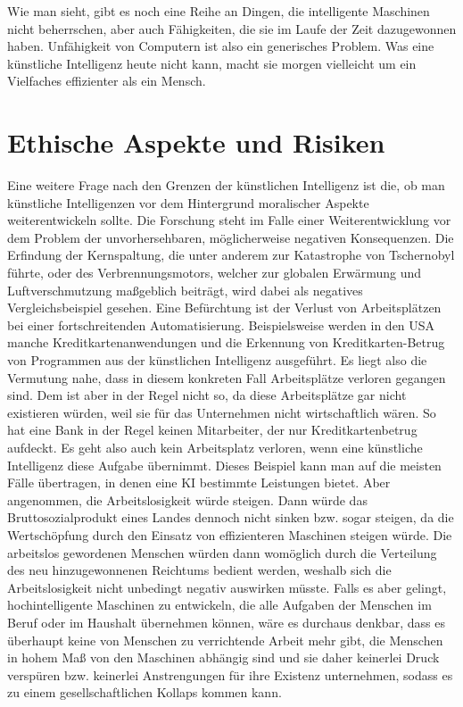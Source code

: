 Wie man sieht, gibt es noch eine Reihe an Dingen, die intelligente Maschinen nicht beherrschen, aber auch Fähigkeiten, die sie im Laufe der Zeit dazugewonnen haben.
Unfähigkeit von Computern ist also ein generisches Problem.
Was eine künstliche Intelligenz heute nicht kann, macht sie morgen vielleicht um ein Vielfaches effizienter als ein Mensch.

\section{Ethische Aspekte und Risiken}
Eine weitere Frage nach den Grenzen der künstlichen Intelligenz ist die, ob man künstliche Intelligenzen vor dem Hintergrund moralischer Aspekte weiterentwickeln sollte.
Die Forschung steht im Falle einer Weiterentwicklung vor dem Problem der unvorhersehbaren, möglicherweise negativen Konsequenzen.
Die Erfindung der Kernspaltung, die unter anderem zur Katastrophe von Tschernobyl führte, oder des Verbrennungsmotors, welcher zur globalen Erwärmung und Luftverschmutzung maßgeblich beiträgt, wird dabei als negatives Vergleichsbeispiel gesehen.
Eine Befürchtung ist der Verlust von Arbeitsplätzen bei einer fortschreitenden Automatisierung.
Beispielsweise werden in den USA manche Kreditkartenanwendungen und die Erkennung von Kreditkarten-Betrug von Programmen aus der künstlichen Intelligenz ausgeführt.
Es liegt also die Vermutung nahe, dass in diesem konkreten Fall Arbeitsplätze verloren gegangen sind.
Dem ist aber in der Regel nicht so, da diese Arbeitsplätze gar nicht existieren würden, weil sie für das Unternehmen nicht wirtschaftlich wären.
So hat eine Bank in der Regel keinen Mitarbeiter, der nur Kreditkartenbetrug aufdeckt.
Es geht also auch kein Arbeitsplatz verloren, wenn eine künstliche Intelligenz diese Aufgabe übernimmt.
Dieses Beispiel kann man auf die meisten Fälle übertragen, in denen eine KI bestimmte Leistungen bietet.
Aber angenommen, die Arbeitslosigkeit würde steigen.
Dann würde das Bruttosozialprodukt eines Landes dennoch nicht sinken bzw.
sogar steigen, da die Wertschöpfung durch den Einsatz von effizienteren Maschinen steigen
würde.
Die arbeitslos gewordenen Menschen würden dann womöglich durch die Verteilung
des neu hinzugewonnenen Reichtums bedient werden, weshalb sich die Arbeitslosigkeit nicht unbedingt negativ auswirken müsste.
Falls es aber gelingt, hochintelligente Maschinen zu entwickeln, die alle Aufgaben der Menschen im Beruf oder im Haushalt übernehmen können, wäre es durchaus denkbar, dass es überhaupt keine von Menschen zu verrichtende Arbeit mehr gibt, die Menschen in hohem Maß von den Maschinen abhängig sind und sie daher keinerlei Druck verspüren bzw.
keinerlei Anstrengungen für ihre Existenz unternehmen, sodass es zu einem gesellschaftlichen Kollaps kommen kann.

